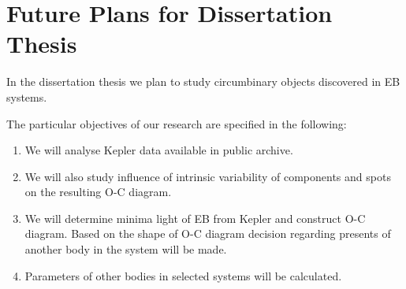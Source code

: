 \chapter{Future Plans for Dissertation Thesis} %
\label{Chapter_Aim} %




In the dissertation thesis we plan to study circumbinary objects discovered in EB systems. 

The particular objectives of our research are specified in the following:

\begin{enumerate}

\item We will analyse Kepler data available in public archive.
\item We will also study influence of intrinsic variability of components and spots on the resulting O-C diagram.  
\item We will determine minima light of EB from Kepler and construct O-C diagram. Based on the shape of O-C diagram decision regarding presents of
another body in the system will be made. 
\item Parameters of other bodies in selected systems will be calculated.  


\end{enumerate}